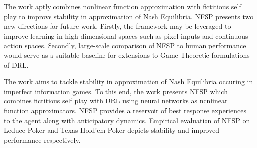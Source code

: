 \documentclass[11pt,letterpaper]{article}
\begin{document}
The work aptly combines nonlinear function approximation with fictitious self play to improve stability in approximation of Nash Equilibria. NFSP presents two new directions for future work. Firstly, the framework may be leveraged to improve learning in high dimensional spaces such as pixel inputs and continuous action spaces. Secondly, large-scale comparison of NFSP to human performance would serve as a suitable baseline for extensions to Game Theoretic formulations of DRL. 

 The work aims to tackle stability in approximation of Nash Equilibria occuring in imperfect information games. To this end, the work presents NFSP which combines fictitious self play with DRL using neural networks as nonlinear function approximators. NFSP provides a reservoir of best response experiences to the agent along with anticipatory dynamics. Empirical evaluation of NFSP on Leduce Poker and Texas Hold'em Poker depicts stability and improved performance respectively.  
\end{document}
